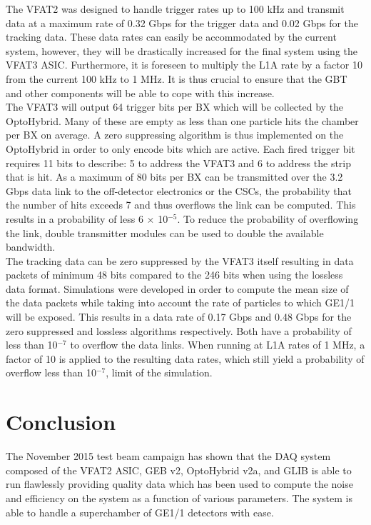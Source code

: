     The VFAT2 was designed to handle trigger rates up to 100 kHz and transmit data at a maximum rate of 0.32 Gbps for the trigger data and 0.02 Gbps for the tracking data. These data rates can easily be accommodated by the current system, however, they will be drastically increased for the final system using the VFAT3 ASIC. Furthermore, it is foreseen to multiply the L1A rate by a factor 10 from the current 100 kHz to 1 MHz. It is thus crucial to ensure that the GBT and other components will be able to cope with this increase. \\

    The VFAT3 will output 64 trigger bits per BX which will be collected by the OptoHybrid. Many of these are empty as less than one particle hits the chamber per BX on average. A zero suppressing algorithm is thus implemented on the OptoHybrid in order to only encode bits which are active. Each fired trigger bit requires 11 bits to describe: 5 to address the VFAT3 and 6 to address the strip that is hit. As a maximum of 80 bits per BX can be transmitted over the 3.2 Gbps data link to the off-detector electronics or the CSCs, the probability that the number of hits exceeds 7 and thus overflows the link can be computed. This results in a probability of less 6 $ \times $ 10$^{-5}$. To reduce the probability of overflowing the link, double transmitter modules can be used to double the available bandwidth. \\

    The tracking data can be zero suppressed by the VFAT3 itself resulting in data packets of minimum 48 bits compared to the 246 bits when using the lossless data format. Simulations were developed in order to compute the mean size of the data packets while taking into account the rate of particles to which GE1/1 will be exposed. This results in a data rate of 0.17 Gbps and 0.48 Gbps for the zero suppressed and lossless algorithms respectively. Both have a probability of less than 10$^{-7}$ to overflow the data links. When running at L1A rates of 1 MHz, a factor of 10 is applied to the resulting data rates, which still yield a probability of overflow less than 10$^{-7}$, limit of the simulation.

  \section{Conclusion}

    The November 2015 test beam campaign has shown that the DAQ system composed of the VFAT2 ASIC, GEB v2, OptoHybrid v2a, and GLIB is able to run flawlessly providing quality data which has been used to compute the noise and efficiency on the system as a function of various parameters. The system is able to handle a superchamber of GE1/1 detectors with ease. \\

